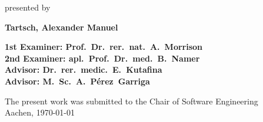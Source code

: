 \begin{titlepage}
\begin{flushleft}
{		{\large presented by\\} 
    
    {\LARGE \textbf{Tartsch, Alexander Manuel}\\}
    \vspace{3em} 
		    
    {\Large \textbf{1st Examiner: Prof.\ Dr.\ rer.\ nat.\ A.\ Morrison}\\}
    \vspace{1em} 
    {\Large \textbf{2nd Examiner: apl.\ Prof.\ Dr.\ med.\ B.\ Namer}\\}
    \vspace{1em} 
    {\Large \textbf{Advisor: Dr.\ rer.\ medic.\ E.\ Kutafina}\\}
    \vspace{1em} 
    {\Large \textbf{Advisor: M.\ Sc.\ A.\ Pérez\ Garriga}\\}
    \vspace{7em} 

    {\large The present work was submitted to the Chair of Software Engineering \\}
    \vspace{1em}
		{\large	Aachen, \today\\}
  }
\end{flushleft}

\end{titlepage}





